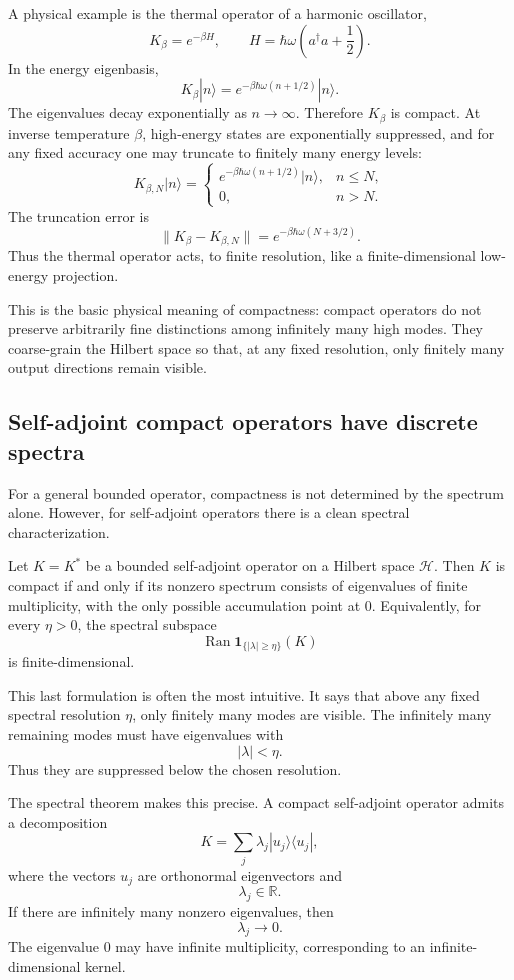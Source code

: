 \documentclass[JHEP,12pt]{article}
\begin{document}
A physical example is the thermal operator of a harmonic oscillator,
\[
K_\beta=e^{-\beta H},
\qquad
H=\hbar\omega\left(a^\dagger a+\frac12\right).
\]
In the energy eigenbasis,
\[
K_\beta |n\rangle
=
e^{-\beta\hbar\omega(n+1/2)}|n\rangle .
\]
The eigenvalues decay exponentially as \(n\to\infty\). Therefore \(K_\beta\) is
compact. At inverse temperature \(\beta\), high-energy states are exponentially
suppressed, and for any fixed accuracy one may truncate to finitely many energy
levels:
\[
K_{\beta,N}|n\rangle=
\begin{cases}
e^{-\beta\hbar\omega(n+1/2)}|n\rangle, & n\le N,\\
0, & n>N .
\end{cases}
\]
The truncation error is
\[
\|K_\beta-K_{\beta,N}\|
=
e^{-\beta\hbar\omega(N+3/2)} .
\]
Thus the thermal operator acts, to finite resolution, like a finite-dimensional
low-energy projection.

This is the basic physical meaning of compactness: compact operators do not
preserve arbitrarily fine distinctions among infinitely many high modes. They
coarse-grain the Hilbert space so that, at any fixed resolution, only finitely
many output directions remain visible.

\subsection{Self-adjoint compact operators have discrete spectra}

For a general bounded operator, compactness is not determined by the spectrum
alone. However, for self-adjoint operators there is a clean spectral
characterization.

Let \(K=K^\ast\) be a bounded self-adjoint operator on a Hilbert space
\(\mathcal H\). Then \(K\) is compact if and only if its nonzero spectrum
consists of eigenvalues of finite multiplicity, with the only possible
accumulation point at \(0\). Equivalently, for every \(\eta>0\), the spectral
subspace
\[
\operatorname{Ran}\mathbf 1_{\{|\lambda|\ge \eta\}}(K)
\]
is finite-dimensional.

This last formulation is often the most intuitive. It says that above any
fixed spectral resolution \(\eta\), only finitely many modes are visible. The
infinitely many remaining modes must have eigenvalues with
\[
|\lambda|<\eta .
\]
Thus they are suppressed below the chosen resolution.

The spectral theorem makes this precise. A compact self-adjoint operator admits
a decomposition
\[
K=\sum_j \lambda_j |u_j\rangle\langle u_j| ,
\]
where the vectors \(u_j\) are orthonormal eigenvectors and
\[
\lambda_j\in\mathbb R .
\]
If there are infinitely many nonzero eigenvalues, then
\[
\lambda_j\to 0 .
\]
The eigenvalue \(0\) may have infinite multiplicity, corresponding to an
infinite-dimensional kernel.
\end{document}
